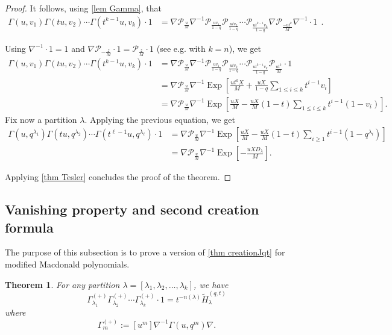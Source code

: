 \documentclass[12pt]{amsart}
\newtheorem{thm}{Theorem}[section]
\theoremstyle{remark}
\newcommand{\tH}{\widetilde{H}^{(q,t)}}
\newcommand{\Pop}{\mathcal{P}}
\newcommand{\Gammaplus}[1]{ {  \Gamma}^{(+)}_{#1}}
\DeclareMathOperator{\Exp}{Exp}
\begin{document}
\begin{proof}
It follows, using \cref{lem Gamma}, that 
\begin{align*}
\Gamma(u,v_1)\Gamma(tu,v_2)\cdots \Gamma(t^{k-1}u,v_k) \cdot 1 
& =\nabla \Pop_{\frac{u}{M}}\nabla^{-1}\Pop_{\frac{uv_1}{1-q}}\Pop_{\frac{utv_2}{1-q}}\cdots\Pop_{\frac{ut^{k-1}v_k}{1-q}}\nabla \Pop_{\frac{-ut^{k}}{M}}\nabla^{-1}\cdot 1\ \ .
\end{align*}

\noindent Using $\nabla^{-1}\cdot 1=1$ and $\nabla \Pop_{-\frac{z}{M}}\cdot 1=\Pop_{\frac{z}{M}}\cdot 1$ (see e.g. \cite[Eq. (1.47)]{DAdderioRomero2023} with $k=n$), we get
\begin{align}
\Gamma(u,v_1)\Gamma(tu,v_2)\cdots\Gamma(t^{k-1}u,v_k)  \cdot 1 
&=\! \nabla \Pop_{\frac{u}{M}}\nabla^{-1}\Pop_{\frac{uv_1}{1-q}}\Pop_{\frac{utv_2}{1-q}}\cdots\Pop_{\frac{ut^{k-1}v_k}{1-q}}\Pop_{\frac{ut^{k}}{M}}\cdot 1\nonumber\\
&=\!\nabla \Pop_{\frac{u}{M}}\! \nabla^{-1}\Exp\!\! \left[\frac{ut^{k}X}{M}+\frac{uX}{1-q}\sum_{1\leq i\leq k}t^{i-1}v_i\right]\label{eq Gamma}\\
& =\! \nabla \Pop_{\frac{u}{M}}\! \nabla^{-1}\Exp\!\! \left[\frac{uX}{M}-\frac{uX}{M}(1-t)\sum_{1\leq i\leq k}t^{i-1}(1-v_i)\right]\!.\nonumber
\end{align}
\noindent    Fix now a partition $\lambda$.	Applying the previous equation, we get
\begin{align*}
\Gamma(u,q^{\lambda_1})\Gamma(tu,q^{\lambda_2})\cdots \Gamma(t^{\ell-1}u,q^{\lambda_{\ell}})\cdot 1 & =\! \nabla \Pop_{\frac{u}{M}}\! \nabla^{-1}\Exp\!\! \left[\frac{uX}{M}-\frac{uX}{M}(1-t)\sum_{i\geq 1}t^{i-1}(1-q^{\lambda_i})\right]\\
	& =\! \nabla \Pop_{\frac{u}{M}}\!\nabla^{-1}\Exp\!\! \left[-\frac{uXD_\lambda}{M} \right].
\end{align*}

\noindent Applying \cref{thm Tesler} concludes the proof of the theorem.
\end{proof}

\subsection{Vanishing property and second creation formula}
The purpose of this subsection is to prove a version of \cref{thm creationJqt} for modified Macdonald polynomials.
\begin{thm} \label{thm creation modified}
	For any partition $\lambda=[\lambda_1,\lambda_2,\dots,\lambda_k]$, we have
	\begin{equation}\label{eq thm creation modified}
		\Gammaplus{\lambda_1}\Gammaplus{\lambda_2}\cdots\Gammaplus{\lambda_k}\cdot1=t^{-n(\lambda)}\tH_{\lambda}
  \end{equation}
  \noindent where
  $$\Gammaplus{m}:=[u^m]\nabla^{-1}\Gamma(u,q^m)\nabla.$$
\end{thm}
\end{document}
